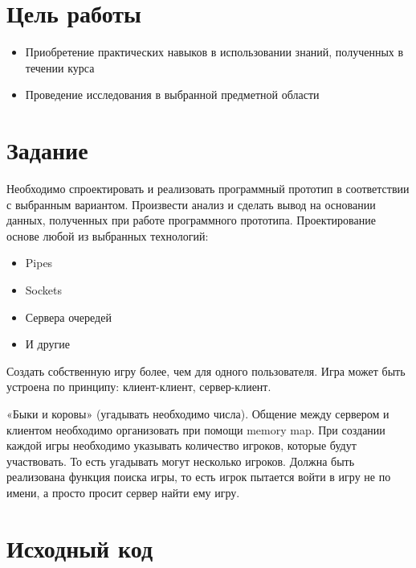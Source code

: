 \documentclass[a4paper, 12pt]{article}
\begin{document}
\section{Цель работы}
\begin{itemize}
    \item Приобретение практических навыков в использовании знаний, полученных в течении
          курса
    \item Проведение исследования в выбранной предметной области
\end{itemize}

\section{Задание}
Необходимо спроектировать и реализовать программный прототип в соответствии с выбранным
вариантом. Произвести анализ и сделать вывод на основании данных, полученных при работе
программного прототипа.
Проектирование основе любой из выбранных технологий:
\begin{itemize}
    \item Pipes
    \item Sockets
    \item Сервера очередей
    \item И другие
\end{itemize}
Создать собственную игру более, чем для одного пользователя. Игра может быть устроена по
принципу: клиент-клиент, сервер-клиент.

«Быки и коровы» (угадывать необходимо числа). Общение между сервером и клиентом
необходимо организовать при помощи memory map. При создании каждой игры
необходимо указывать количество игроков, которые будут участвовать. То есть угадывать
могут несколько игроков. Должна быть реализована функция поиска игры, то есть игрок
пытается войти в игру не по имени, а просто просит сервер найти ему игру.

\newpage
\section{Исходный код}
\end{document}
